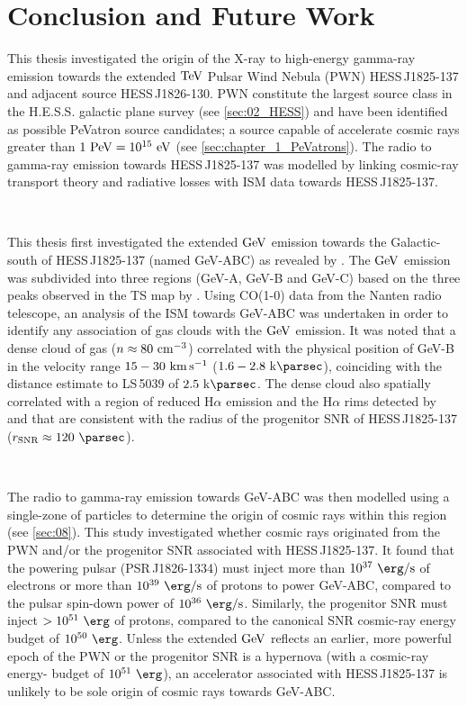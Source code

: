 \chapter{Conclusion and Future Work} \label{sec:10_summary}

This thesis investigated the origin of the X-ray to high-energy gamma-ray emission towards the extended $\TeV$ Pulsar Wind Nebula (PWN) \mbox{HESS\,J1825-137} and adjacent source \mbox{HESS\,J1826-130}. PWN constitute the largest source class in the H.E.S.S. galactic plane survey (see \autoref{sec:02_HESS}) and have been identified as possible PeVatron source candidates; a source capable of accelerate cosmic rays greater than $1~\PeV=10^{15}~\eV$ (see \autoref{sec:chapter_1_PeVatrons}). The radio to gamma-ray emission towards \mbox{HESS\,J1825-137} was modelled by linking cosmic-ray transport theory and radiative losses with ISM data towards \mbox{HESS\,J1825-137}.
\par~\par
This thesis first investigated the extended $\si{\giga\electronvolt}$ emission towards the Galactic-south of \mbox{HESS\,J1825-137} (named GeV-ABC) as revealed by \cite{2019MNRAS.485.1001A}. The $\si{\giga\electronvolt}$ emission was subdivided into three regions (GeV-A, GeV-B and GeV-C) based on the three peaks observed in the TS map by \cite{2019MNRAS.485.1001A}. Using CO(1-0) data from the Nanten radio telescope, an analysis of the ISM towards GeV-ABC was undertaken in order to identify any association of gas clouds with the $\si{\giga\electronvolt}$ emission. It was noted that a dense cloud of gas ($n\approx 80~\si{\per\centi\meter\cubed}$) correlated with the physical position of GeV-B in the velocity range $15-30~\si{\kilo\meter\per\second}$ ($1.6-2.8~\kpc$), coinciding with the distance estimate to \mbox{LS\,5039} of $2.5~\kpc$. The dense cloud also spatially correlated with a region of reduced H$\alpha$ emission and the H$\alpha$ rims detected by \cite{2008MNRAS.390.1037S} and \cite{2016MNRAS.458.2813V} that are consistent with the radius of the progenitor SNR of \mbox{HESS\,J1825-137} ($r_\text{SNR}\approx 120~\pc$).
\par~\par
The radio to gamma-ray emission towards \mbox{GeV-ABC} was then modelled using a single-zone of particles to determine the origin of cosmic rays within this region (see \autoref{sec:08}). This study investigated whether cosmic rays originated from the PWN and/or the progenitor SNR associated with \mbox{HESS\,J1825-137}. It found that the powering pulsar (\mbox{PSR\,J1826-1334}) must inject more than {$10^{37}~\ergspersec$} of electrons or more than $10^{39}~\ergspersec$ of protons to power \mbox{GeV-ABC}, compared to the pulsar spin-down power of $10^{36}~\ergspersec$. Similarly, the progenitor SNR must inject $>10^{51}~\ergs$ of protons, compared to the canonical SNR cosmic-ray energy budget of $10^{50}~\ergs$. Unless the extended $\si{\giga\electronvolt}$ reflects an earlier, more powerful epoch of the PWN or the progenitor SNR is a hypernova (with a cosmic-ray energy- budget of $10^{51}~\ergs$), an accelerator associated with \mbox{HESS\,J1825-137} is unlikely to be sole origin of cosmic rays towards \mbox{GeV-ABC}.
